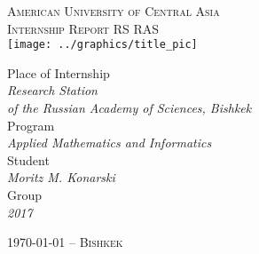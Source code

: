 \documentclass[a4paper, 12pt, reqno]{article}
\newcommand{\titl}{Internship Report RS RAS}
\newcommand{\auth}{Moritz M. Konarski}
\begin{document}
\thispagestyle{empty}
\begin{center}
    \Large
    \vspace{10pt}
    \textsc{American University of Central Asia}\\[10pt]
    \textsc{\titl{}}\\ [1.5cm]

    \texttt{[image: ../graphics/title\_pic]}

    \vspace{1.5cm}

    \normalsize
    Place of Internship\\
    \textit{Research Station \\
    of the Russian Academy of Sciences, Bishkek}\\[10pt]

    Program\\
    \textit{Applied Mathematics and Informatics}\\[10pt]

    Student\\
    \textit{\auth{}}\\[10pt]

    Group\\
    \textit{2017}\\

    \vfill

    \large
    \textsc{\today{} -- Bishkek}
    \normalsize
\end{center}

\restoregeometry
\newpage

\afterpage{\cfoot{\thepage}}
\tableofcontents

\newpage















\newpage
\nocite{*}



\newpage
\appendix
\appendixpage

\end{document}
